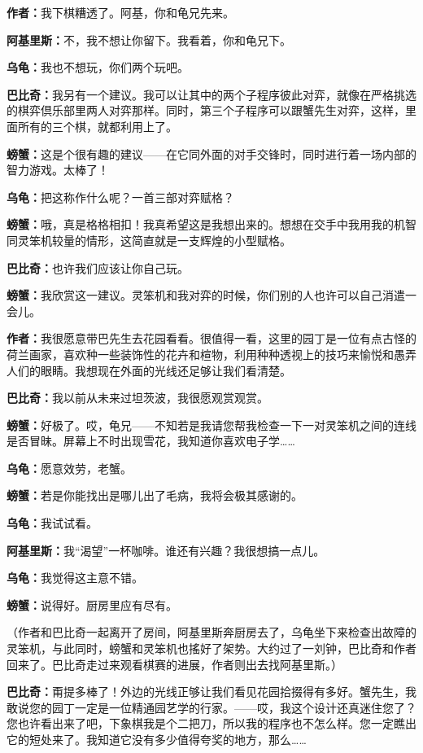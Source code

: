 \documentclass[
  12pt,
  twoside,
  openright,
  oldfontcommands,
]{memoir}
\newcommand{\dialogname}[1]{{\sffamily\bfseries #1}}
\begin{document}
\dialogname{作者：}我下棋糟透了。阿基，你和龟兄先来。

\dialogname{阿基里斯：}不，我不想让你留下。我看着，你和龟兄下。

\dialogname{乌龟：}我也不想玩，你们两个玩吧。

\dialogname{巴比奇：}我另有一个建议。我可以让其中的两个子程序彼此对弈，就像在严格挑选的棋弈倶乐部里两人对弈那样。同时，第三个子程序可以跟蟹先生对弈，这样，里面所有的三个棋，就都利用上了。

\dialogname{螃蟹：}这是个很有趣的建议------在它同外面的对手交锋时，同时进行着一场内部的智力游戏。太棒了！

\dialogname{乌龟：}把这称作什么呢？一首三部对弈赋格？

\dialogname{螃蟹：}哦，真是格格相扣！我真希望这是我想出来的。想想在交手中我用我的机智同灵笨机较量的情形，这简直就是一支辉煌的小型赋格。

\dialogname{巴比奇：}也许我们应该让你自己玩。

\dialogname{螃蟹：}我欣赏这一建议。灵笨机和我对弈的时候，你们别的人也许可以自己消遣一会儿。

\dialogname{作者：}我很愿意带巴先生去花园看看。很值得一看，这里的园丁是一位有点古怪的荷兰画家，喜欢种一些装饰性的花卉和楦物，利用种种透视上的技巧来愉悦和愚弄人们的眼睛。我想现在外面的光线还足够让我们看清楚。

\dialogname{巴比奇：}我以前从未来过坦茨波，我很愿观赏观赏。

\dialogname{螃蟹：}好极了。哎，龟兄------不知若是我请您帮我检查一下一对灵笨机之间的连线是否冒昧。屏幕上不时出现雪花，我知道你喜欢电子学\ldots\ldots{}

\dialogname{乌龟：}愿意效劳，老蟹。

\dialogname{螃蟹：}若是你能找出是哪儿出了毛病，我将会极其感谢的。

\dialogname{乌龟：}我试试看。

\dialogname{阿基里斯：}我``渴望''一杯咖啡。谁还有兴趣？我很想搞一点儿。

\dialogname{乌龟：}我觉得这主意不错。

\dialogname{螃蟹：}说得好。厨房里应有尽有。

（作者和巴比奇一起离开了房间，阿基里斯奔厨房去了，乌龟坐下来检查出故障的灵笨机，与此同时，螃蟹和灵笨机也搖好了架势。大约过了一刘钟，巴比奇和作者回来了。巴比奇走过来观看棋赛的进展，作者则出去找阿基里斯。）

\dialogname{巴比奇：}甭提多棒了！外边的光线正够让我们看见花园拾掇得有多好。蟹先生，我敢说您的园丁一定是一位精通园艺学的行家。------哎，我这个设计还真迷住您了？您也许看出来了吧，下象棋我是个二把刀，所以我的程序也不怎么样。您一定瞧出它的短处来了。我知道它没有多少值得夸奖的地方，那么\ldots\ldots{}
\end{document}
